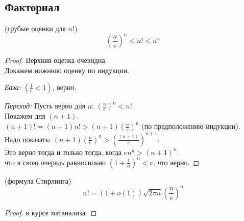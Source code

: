 \subsection{Факториал}

\begin{lemma} (грубые оценки для $n!$)
    \[ \left( \frac{n}{e} \right)^n < n! < n^n \]
\end{lemma}

\begin{proof}
    Верхняя оценка очевидна.\\
    Докажем нижнюю оценку по индукции.

    \textsl{База:} $\left( \frac{1}{e} < 1 \right)$, верно.

    \textsl{Переход:} Пусть верно для $n$: $\left( \frac{n}{e} \right)^n < n!$.\\
    Покажем для $(n + 1)$.\\
    $(n + 1)! = (n + 1)n! > (n + 1) \left( \frac{n}{e} \right)^n$ (по предположению индукции).\\
    Надо показать: $(n + 1) \left( \frac{n}{e} \right)^n > \left( \frac{(n + 1)}{e} \right)^{n + 1}$.\\
    Это верно тогда и только тогда, когда $en^n > (n + 1)^n$.\\
    что в свою очередь равносильно $\left( 1 + \frac{1}{n} \right)^n < e$, что верно.
\end{proof}

\begin{theorem} (формула Стирлинга)
    \[ n! = (1 + o(1)) \sqrt{2 \pi n} \left( \frac{n}{e} \right)^n \]
\end{theorem}

\begin{proof}
    в курсе матанализа.
\end{proof}